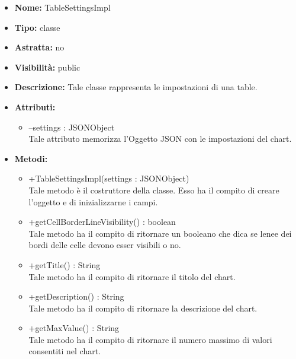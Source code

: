 			
			\begin{itemize}
			\item \textbf{Nome:} TableSettingsImpl
			\item \textbf{Tipo:} classe
			
		\item \textbf{Astratta:}
		no
			\item \textbf{Visibilità:} public
			\item \textbf{Descrizione:} Tale classe rappresenta le impostazioni di una table.
			\item \textbf{Attributi:}
				\begin{itemize}
				\setlength{\itemsep}{5pt}
				
					\item[\ding{111}] {--settings : JSONObject} \\ [1mm] Tale attributo memorizza l'Oggetto JSON con le impostazioni del chart.
				\end{itemize}
		
			\item \textbf{Metodi:}
				\begin{itemize}
				\setlength{\itemsep}{5pt}
				
					\item[\ding{111}] {{+TableSettingsImpl(settings : JSONObject)}} \\ [1mm] Tale metodo è il costruttore della classe. Esso ha il compito di creare l'oggetto e di inizializzarne i campi.
					\item[\ding{111}] {{+getCellBorderLineVisibility() : boolean}} \\ [1mm] Tale metodo ha il compito di ritornare un booleano che dica se lenee dei bordi delle celle devono esser visibili o no.
					\item[\ding{111}] {{+getTitle() : String}} \\ [1mm] Tale metodo ha il compito di ritornare il titolo del chart.
					\item[\ding{111}] {{+getDescription() : String}} \\ [1mm] Tale metodo ha il compito di ritornare la descrizione del chart.
					\item[\ding{111}] {{+getMaxValue() : String}} \\ [1mm] Tale metodo ha il compito di ritornare il numero massimo di valori consentiti nel chart.
				\end{itemize}
		
			\end{itemize}
	
